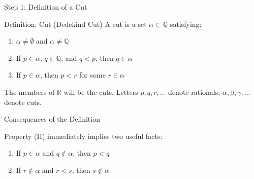 \documentclass[aspectratio=169,12pt,t]{beamer}
\begin{document}
{%
\begin{frame}{Step 1: Definition of a Cut}
  \begin{defblock}{Definition: Cut (Dedekind Cut)}
    A \alert{cut} is a set $\alpha \subset \mathbb{Q}$ satisfying:
    \begin{enumerate}
      \item[\textbf{(I)}] $\alpha \neq \emptyset$ and $\alpha \neq \mathbb{Q}$
      \item[\textbf{(II)}] If $p \in \alpha$, $q \in \mathbb{Q}$, and $q < p$,
            then $q \in \alpha$
      \item[\textbf{(III)}] If $p \in \alpha$, then $p < r$ for some
            $r \in \alpha$
    \end{enumerate}
  \end{defblock}

  \vspace{0.3em}
  \begin{hlbox}
    The members of $\mathbb{R}$ will be the cuts. Letters $p, q, r, \dots$ denote
    rationals; $\alpha, \beta, \gamma, \dots$ denote cuts.
  \end{hlbox}

\end{frame}

\begin{frame}{Consequences of the Definition}
  \begin{hlbox}
    Property (II) immediately implies two useful facts:

    \vspace{0.5em}
    \begin{enumerate}
      \item If $p \in \alpha$ and $q \notin \alpha$, then $p < q$

      \vspace{0.5em}
      \item If $r \notin \alpha$ and $r < s$, then $s \notin \alpha$
    \end{enumerate}


\end{hlbox}
\end{frame}}
\end{document}
